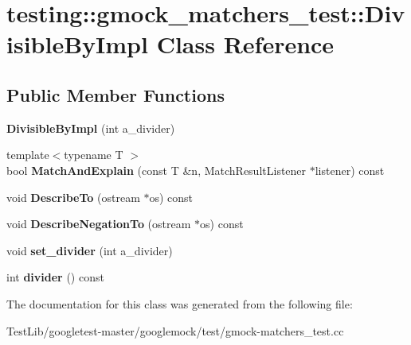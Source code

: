 \hypertarget{classtesting_1_1gmock__matchers__test_1_1DivisibleByImpl}{}\section{testing\+:\+:gmock\+\_\+matchers\+\_\+test\+:\+:Divisible\+By\+Impl Class Reference}
\label{classtesting_1_1gmock__matchers__test_1_1DivisibleByImpl}
\subsection*{Public Member Functions}
\begin{DoxyCompactItemize}
\item 
\mbox{\label{classtesting_1_1gmock__matchers__test_1_1DivisibleByImpl_aab5d8d383a8cbf112fe087c4f0f3f699}} 
{\bfseries Divisible\+By\+Impl} (int a\+\_\+divider)
\item 
\mbox{\label{classtesting_1_1gmock__matchers__test_1_1DivisibleByImpl_a2621df4b34315b327e20b6f4d901417d}} 
{\footnotesize template$<$typename T $>$ }\\bool {\bfseries Match\+And\+Explain} (const T \&n, Match\+Result\+Listener $\ast$listener) const
\item 
\mbox{\label{classtesting_1_1gmock__matchers__test_1_1DivisibleByImpl_aabd14d5f96ef6851141d9ed9fbee3f86}} 
void {\bfseries Describe\+To} (ostream $\ast$os) const
\item 
\mbox{\label{classtesting_1_1gmock__matchers__test_1_1DivisibleByImpl_a9c061ef411c126c604d4c33d92911d50}} 
void {\bfseries Describe\+Negation\+To} (ostream $\ast$os) const
\item 
\mbox{\label{classtesting_1_1gmock__matchers__test_1_1DivisibleByImpl_a86c8787ab835bc84a9ad7e3931d644cc}} 
void {\bfseries set\+\_\+divider} (int a\+\_\+divider)
\item 
\mbox{\label{classtesting_1_1gmock__matchers__test_1_1DivisibleByImpl_afaf102bc25623966dd11805b62e42321}} 
int {\bfseries divider} () const
\end{DoxyCompactItemize}


The documentation for this class was generated from the following file\+:\begin{DoxyCompactItemize}
\item 
Test\+Lib/googletest-\/master/googlemock/test/gmock-\/matchers\+\_\+test.\+cc\end{DoxyCompactItemize}
